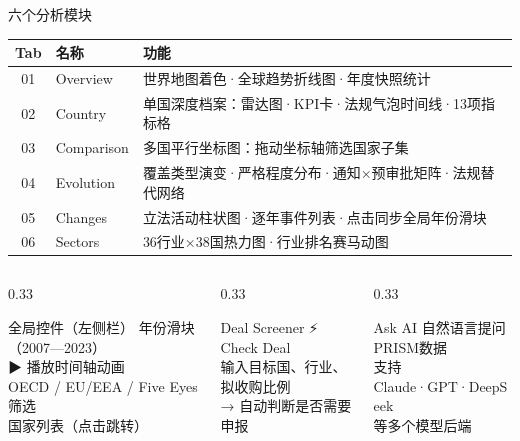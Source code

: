 \documentclass[aspectratio=169,11pt]{beamer}
\begin{document}
\begin{frame}{六个分析模块}
  \begin{table}
  \footnotesize
  \begin{tabularx}{\linewidth}{clX}
    \toprule
    \textbf{Tab} & \textbf{名称} & \textbf{功能} \\
    \midrule
    01 & Overview  & 世界地图着色·全球趋势折线图·年度快照统计 \\
    02 & Country   & 单国深度档案：雷达图·KPI卡·法规气泡时间线·13项指标格 \\
    03 & Comparison & 多国平行坐标图：拖动坐标轴筛选国家子集 \\
    04 & Evolution & 覆盖类型演变·严格程度分布·通知×预审批矩阵·法规替代网络 \\
    05 & Changes   & 立法活动柱状图·逐年事件列表·点击同步全局年份滑块 \\
    06 & Sectors   & 36行业×38国热力图·行业排名赛马动图 \\
    \bottomrule
  \end{tabularx}
  \end{table}
  \vspace{0.3em}
  \begin{columns}[T]
    \begin{column}{0.33\linewidth}
      \begin{block}{\small 全局控件（左侧栏）}
        \footnotesize
        年份滑块（2007—2023）\\
        ▶ 播放时间轴动画\\
        OECD / EU/EEA / Five Eyes 筛选\\
        国家列表（点击跳转）
      \end{block}
    \end{column}
    \begin{column}{0.33\linewidth}
      \begin{alertblock}{\small Deal Screener}
        \footnotesize
        ⚡ Check Deal\\
        输入目标国、行业、拟收购比例\\
        → 自动判断是否需要申报
      \end{alertblock}
    \end{column}
    \begin{column}{0.33\linewidth}
      \begin{exampleblock}{\small Ask AI}
        \footnotesize
        自然语言提问PRISM数据\\
        支持Claude·GPT·DeepSeek\\
        等多个模型后端
      \end{exampleblock}
    \end{column}
  \end{columns}
\end{frame}
\end{document}

